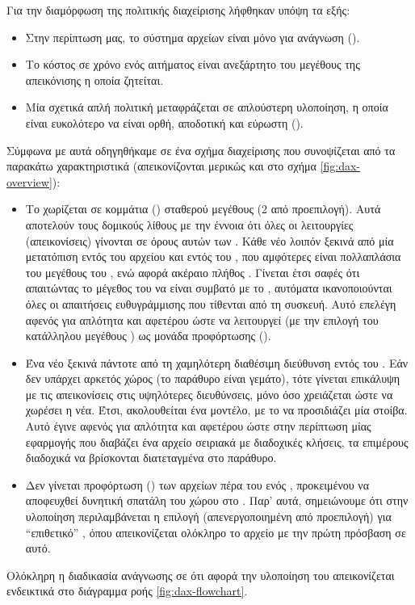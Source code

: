 Για την διαμόρφωση της πολιτικής διαχείρισης λήφθηκαν υπόψη τα εξής:
\begin{itemize}
    \item Στην περίπτωση μας, το σύστημα αρχείων είναι μόνο για ανάγνωση
          ().
    \item Το κόστος σε χρόνο ενός αιτήματος  είναι
          ανεξάρτητο του μεγέθους της απεικόνισης η οποία ζητείται.
    \item Μία σχετικά απλή πολιτική μεταφράζεται σε απλούστερη υλοποίηση,
          η οποία είναι ευκολότερο να είναι ορθή, αποδοτική και εύρωστη
          ().
\end{itemize}
Σύμφωνα με αυτά οδηγηθήκαμε σε ένα σχήμα διαχείρισης που συνοψίζεται από τα
παρακάτω χαρακτηριστικά (απεικονίζονται μερικώς και στο σχήμα
\ref{fig:dax-overview}):
\begin{itemize}
    \item Το  χωρίζεται σε κομμάτια (\emph{}) σταθερού
          μεγέθους (2  από προεπιλογή). Αυτά αποτελούν τους δομικούς
          λίθους με την έννοια ότι όλες οι λειτουργίες (απεικονίσεις) γίνονται
          σε όρους αυτών των . Κάθε νέο  λοιπόν ξεκινά
          από μία μετατόπιση εντός του αρχείου και εντός του ,
          που αμφότερες είναι πολλαπλάσια του μεγέθους του , ενώ αφορά
          ακέραιο πλήθος . Γίνεται έτσι σαφές ότι απαιτώντας το
          μέγεθος του  να είναι συμβατό με το ,
          αυτόματα ικανοποιούνται όλες οι απαιτήσεις ευθυγράμμισης που τίθενται
          από τη \viofs{} συσκευή. Αυτό επελέγη αφενός για απλότητα και αφετέρου
          ώστε να λειτουργεί (με την επιλογή του κατάλληλου μεγέθους )
          ως μονάδα προφόρτωσης ().
    \item Ένα νέο  ξεκινά πάντοτε από τη χαμηλότερη διαθέσιμη
          διεύθυνση εντός του . Εάν δεν υπάρχει αρκετός χώρος
          (το παράθυρο είναι γεμάτο), τότε γίνεται επικάλυψη με τις απεικονίσεις
          στις υψηλότερες διευθύνσεις, μόνο όσο χρειάζεται ώστε να χωρέσει η
          νέα. Έτσι, ακολουθείται ένα  μοντέλο,
          με το  να προσιδιάζει μία στοίβα. Αυτό έγινε αφενός
          για απλότητα και αφετέρου ώστε στην περίπτωση μίας εφαρμογής που
          διαβάζει ένα αρχείο σειριακά με διαδοχικές κλήσεις, τα επιμέρους
          διαδοχικά  να βρίσκονται διατεταγμένα στο παράθυρο.
    \item Δεν γίνεται προφόρτωση () των αρχείων πέρα του
          ενός , προκειμένου να αποφευχθεί δυνητική σπατάλη του χώρου
          στο . Παρ' αυτά, σημειώνουμε ότι στην υλοποίηση
          περιλαμβάνεται η επιλογή (απενεργοποιημένη από προεπιλογή) για
          ``επιθετικό'' , όπου απεικονίζεται ολόκληρο το αρχείο
          με την πρώτη πρόσβαση σε αυτό.
\end{itemize}
Ολόκληρη η διαδικασία ανάγνωσης σε ότι αφορά την υλοποίηση του \viofs{}
απεικονίζεται ενδεικτικά στο διάγραμμα ροής \ref{fig:dax-flowchart}.

